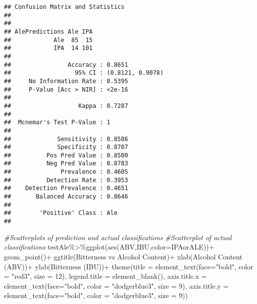 \documentclass[
]{article}
\newenvironment{Shaded}{\begin{snugshade}}{\end{snugshade}}
\newcommand{\AttributeTok}[1]{\textcolor[rgb]{0.77,0.63,0.00}{#1}}
\newcommand{\CommentTok}[1]{\textcolor[rgb]{0.56,0.35,0.01}{\textit{#1}}}
\newcommand{\DecValTok}[1]{\textcolor[rgb]{0.00,0.00,0.81}{#1}}
\newcommand{\FunctionTok}[1]{\textcolor[rgb]{0.00,0.00,0.00}{#1}}
\newcommand{\NormalTok}[1]{#1}
\newcommand{\SpecialCharTok}[1]{\textcolor[rgb]{0.00,0.00,0.00}{#1}}
\newcommand{\StringTok}[1]{\textcolor[rgb]{0.31,0.60,0.02}{#1}}
\begin{document}
\begin{verbatim}
## Confusion Matrix and Statistics
## 
##               
## AlePredictions Ale IPA
##            Ale  85  15
##            IPA  14 101
##                                           
##                Accuracy : 0.8651          
##                  95% CI : (0.8121, 0.9078)
##     No Information Rate : 0.5395          
##     P-Value [Acc > NIR] : <2e-16          
##                                           
##                   Kappa : 0.7287          
##                                           
##  Mcnemar's Test P-Value : 1               
##                                           
##             Sensitivity : 0.8586          
##             Specificity : 0.8707          
##          Pos Pred Value : 0.8500          
##          Neg Pred Value : 0.8783          
##              Prevalence : 0.4605          
##          Detection Rate : 0.3953          
##    Detection Prevalence : 0.4651          
##       Balanced Accuracy : 0.8646          
##                                           
##        'Positive' Class : Ale             
## 
\end{verbatim}

\begin{Shaded}
\begin{Highlighting}[]
\CommentTok{\#Scatterplots of prediction and actual classifications}
\CommentTok{\#Scatterplot of actual classifications}
\NormalTok{testAle}\SpecialCharTok{\%\textgreater{}\%}\FunctionTok{ggplot}\NormalTok{(}\FunctionTok{aes}\NormalTok{(ABV,IBU,}\AttributeTok{color=}\NormalTok{IPAorALE))}\SpecialCharTok{+}
  \FunctionTok{geom\_point}\NormalTok{()}\SpecialCharTok{+}
  \FunctionTok{ggtitle}\NormalTok{(}\StringTok{\textquotesingle{}Bitterness vs Alcohol Content\textquotesingle{}}\NormalTok{)}\SpecialCharTok{+}
  \FunctionTok{xlab}\NormalTok{(}\StringTok{\textquotesingle{}Alcohol Content (ABV)\textquotesingle{}}\NormalTok{)}\SpecialCharTok{+}
  \FunctionTok{ylab}\NormalTok{(}\StringTok{\textquotesingle{}Bitterness (IBU)\textquotesingle{}}\NormalTok{)}\SpecialCharTok{+}
  \FunctionTok{theme}\NormalTok{(}\AttributeTok{title =} \FunctionTok{element\_text}\NormalTok{(}\AttributeTok{face=}\StringTok{"bold"}\NormalTok{, }\AttributeTok{color =} \StringTok{"red3"}\NormalTok{, }\AttributeTok{size =} \DecValTok{12}\NormalTok{),}
        \AttributeTok{legend.title =} \FunctionTok{element\_blank}\NormalTok{(),}
        \AttributeTok{axis.title.x =} \FunctionTok{element\_text}\NormalTok{(}\AttributeTok{face=}\StringTok{"bold"}\NormalTok{, }\AttributeTok{color =} \StringTok{"dodgerblue3"}\NormalTok{, }\AttributeTok{size =} \DecValTok{9}\NormalTok{),}
        \AttributeTok{axis.title.y =} \FunctionTok{element\_text}\NormalTok{(}\AttributeTok{face=}\StringTok{"bold"}\NormalTok{, }\AttributeTok{color =} \StringTok{"dodgerblue3"}\NormalTok{, }\AttributeTok{size =} \DecValTok{9}\NormalTok{))}
\end{Highlighting}
\end{Shaded}
\end{document}
